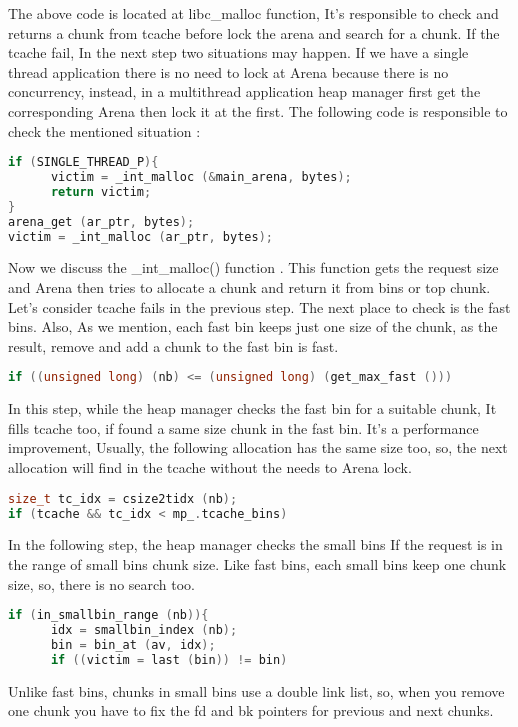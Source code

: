 \documentclass{masterthesis}
\newcommand*\tch{tcache}
\begin{document}
The above code is located at libc\_malloc function, It's responsible to check and returns a chunk from tcache before lock the arena and search for a chunk. If the \tch{} fail, In the next step two situations may happen. If we have a single thread application there is no need to lock at Arena because there is no concurrency, instead, in a multi\-thread application heap manager first get the corresponding Arena then lock it at the first. The following code is responsible to check the mentioned situation :
\begin{lstlisting}[language=c]
if (SINGLE_THREAD_P){
      victim = _int_malloc (&main_arena, bytes);
      return victim;
}
arena_get (ar_ptr, bytes);
victim = _int_malloc (ar_ptr, bytes);
\end{lstlisting}

Now we discuss the \_int\_malloc() function . This function gets the request size and Arena then tries to allocate a chunk and return it from bins or top chunk. Let's consider \tch{} fails in the previous step. The next place to check is the fast bins. Also, As we mention, each fast bin keeps just one size of the chunk, as the result, remove and add a chunk to the fast bin is fast.
\begin{lstlisting}[language=c]
if ((unsigned long) (nb) <= (unsigned long) (get_max_fast ()))
\end{lstlisting}
In this step, while the heap manager checks the fast bin for a suitable chunk, It fills \tch{} too, if found a same size chunk in the fast bin. It's a performance improvement, Usually, the following allocation has the same size too, so, the next allocation will find in the \tch{} without the needs to Arena lock.
\begin{lstlisting}[language=c]
size_t tc_idx = csize2tidx (nb);
if (tcache && tc_idx < mp_.tcache_bins)
\end{lstlisting}

In the following step, the heap manager checks the small bins If the request is in the range of small bins chunk size. Like fast bins, each small bins keep one chunk size, so, there is no search too.
\begin{lstlisting}[language=c]
if (in_smallbin_range (nb)){
      idx = smallbin_index (nb);
      bin = bin_at (av, idx);
      if ((victim = last (bin)) != bin)
\end{lstlisting}

Unlike fast bins, chunks in small bins use a double link list, so, when you remove one chunk you have to fix the fd and bk pointers for previous and next chunks. 
\end{document}
